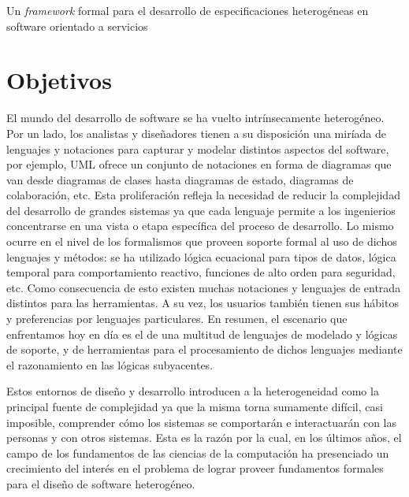 \documentclass[a4paper, 11pt]{article}
\begin{document}
\begin{Large}
 \begin{center}
    Un \emph{framework} formal para el desarrollo de especificaciones heterogéneas en software orientado a servicios
 \end{center}

\end{Large}


\section{Objetivos}
  El mundo del desarrollo de software se ha vuelto intrínsecamente heterogéneo. Por un lado, los analistas y diseñadores tienen a su disposición una miríada de lenguajes y notaciones para capturar y modelar distintos aspectos del software, por ejemplo, UML \cite{omg-sysml04,omg-ocl04} ofrece un conjunto de notaciones en forma de diagramas que van desde diagramas de clases hasta diagramas de estado, diagramas de colaboración, etc. Esta proliferación refleja la necesidad de reducir la complejidad del desarrollo de grandes sistemas ya que cada lenguaje permite a los ingenierios concentrarse en una vista o etapa específica del proceso de desarrollo. Lo mismo ocurre en el nivel de los formalismos que proveen soporte formal al uso de dichos lenguajes y métodos: se ha utilizado lógica ecuacional para tipos de datos, lógica temporal para comportamiento reactivo, funciones de alto orden para seguridad, etc. Como consecuencia de esto existen muchas notaciones y lenguajes de entrada distintos para las herramientas. A su vez, los usuarios también tienen sus hábitos y preferencias por lenguajes particulares. En resumen, el escenario que enfrentamos hoy en día es el de una multitud de lenguajes de modelado y lógicas de soporte, y de herramientas para el procesamiento de dichos lenguajes mediante el razonamiento en las lógicas subyacentes.
  
  Estos entornos de diseño y desarrollo introducen a la heterogeneidad como la principal fuente de complejidad ya que la misma torna sumamente difícil, casi imposible, comprender cómo los sistemas se comportarán e interactuarán con las personas y con otros sistemas. Esta es la razón por la cual, en los últimos años, el campo de los fundamentos de las ciencias de la computación ha presenciado un crecimiento del interés en el problema de lograr proveer fundamentos formales para el diseño de software heterogéneo.
  
\end{document}
